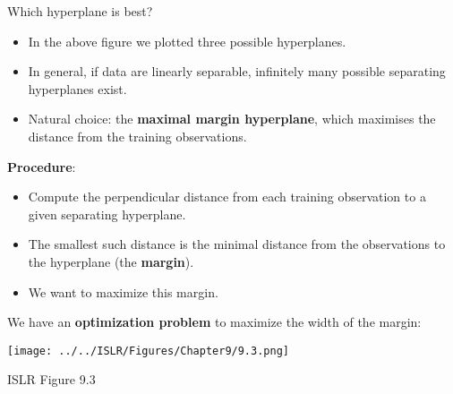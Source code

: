 \documentclass[10pt,ignorenonframetext,]{beamer}
\begin{document}
\begin{frame}

\begin{block}{Which hyperplane is best?}

\vspace{3mm}

\begin{itemize}
\item
  In the above figure we plotted three possible hyperplanes.
\item
  In general, if data are linearly separable, infinitely many possible
  separating hyperplanes exist.
\item
  Natural choice: the \textbf{maximal margin hyperplane}, which
  maximises the distance from the training observations.
\end{itemize}

\vspace{4mm}

\textbf{Procedure}:

\begin{itemize}
\item
  Compute the perpendicular distance from each training observation to a
  given separating hyperplane.
\item
  The smallest such distance is the minimal distance from the
  observations to the hyperplane (the \textbf{margin}).
\item
  We want to maximize this margin.
\end{itemize}

\end{block}

\end{frame}

\begin{frame}

We have an \textbf{optimization problem} to maximize the width of the
margin:

\centering

\texttt{[image: ../../ISLR/Figures/Chapter9/9.3.png]}
\small

ISLR Figure 9.3

\end{frame}
\end{document}

